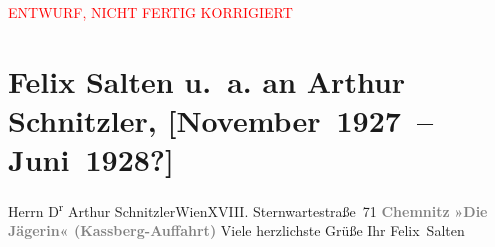 
\begin{center}
            \textcolor{red}{ENTWURF, NICHT FERTIG KORRIGIERT}
                      \end{center}
            
         
         \renewcommand{\erwaehntePersonen}{Personen: Anna Katharina Rehmann, Felix Salten, Ottilie Salten, Paul Salten}
         \renewcommand{\erwaehnteInstitutionen}{Institutionen: Städtische Theater Chemnitz}
         \renewcommand{\erwaehnteOrte}{Orte: Chemnitz, Kaßbergauffahrt, Sternwartestraße 71, Wien}
         \renewcommand{\erwaehnteWerke}{Werke: Diana mit Bogen}
               \section[Felix Salten u. a. an Arthur Schnitzler, {[}November 1927 – Juni 1928?{]}]{ Felix Salten u. a. an Arthur Schnitzler, {[}November 1927 –
               Juni 1928?{]}}\nopagebreak{}\rehead{ }\begin{ledgroupsized}[t]{13cm}\normalsize\beginnumbering \toendnotes[C]{\smallbreak\pagebreak[2]} 
\toendnotes[C]{\smallbreak}\pstart{}{\pb}Herrn D\textsuperscript{r} Arthur Schnitzler\pend{}\pstart{}Wien\pend{}\pstart{}XVIII. Sternwartestraße 71\pend{}{\bigskip}\pstart
           \noindent{}{\pb}\textcolor{gray}{\textbf{Chemnitz}}\pend
           \pstart
           \textcolor{gray}{\textbf{»Die Jägerin« (Kassberg-Auffahrt)}}\pend
           \pstart
           {\pb}Viele herzlichste Grüße\pend
           \pstart Ihr \spacefill\mbox{Felix Salten}\pend{}\pstart

\end{ledgroupsized}
